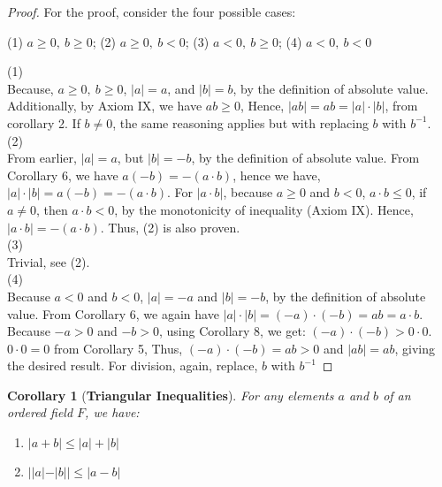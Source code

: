 \documentclass[12pt]{book}
\newtheorem{corollary}{Corollary}
\theoremstyle{definition}
\begin{document}
\begin{proof}
For the proof, consider the four possible cases:
\begin{center}
	(1) $a\geq 0,\: b \geq 0$; (2) $a\geq 0,\: b<0$; (3) $a<0,\: b\geq 0$; (4) $a<0,\: b<0$
\end{center}
(1)\\
Because, $a\geq 0,\: b \geq 0$, $|a| =a$, and $|b| =b$, by the definition of absolute value. Additionally, by Axiom IX, we have $ab\geq 0$, Hence, $|ab|=ab = |a|\cdot |b|$, from corollary 2. If $b\neq 0$, the same reasoning applies but with replacing $b$ with $b^{-1}$.\\
(2)\\
From earlier, $|a|=a$, but $|b|=-b$, by the definition of absolute value. From Corollary 6, we have $a(-b) = -(a\cdot b)$, hence we have, $|a|\cdot |b|= a(-b)=-(a\cdot b)$. For $|a\cdot b|$, because $a\geq 0$ and $b<0$, $a\cdot b \leq 0$, if $a\neq 0$, then $a\cdot b<0$, by the monotonicity of inequality (Axiom IX). Hence, $|a\cdot b| = -(a\cdot b).$ Thus, (2) is also proven.\\
 (3)\\ Trivial, see (2).\\
 (4)\\
 Because $a<0$ and $b<0$, $|a| =-a$ and $|b|=-b$, by the definition of absolute value. From Corollary 6, we again have $|a|\cdot |b| = (-a)\cdot (-b) =ab = a \cdot b$. Because $-a>0$ and $-b>0$, using Corollary 8, we get: $(-a)\cdot (-b) > 0 \cdot 0$. $0\cdot 0= 0$ from Corollary 5, Thus, $(-a)\cdot(-b)=ab >0$ and $|ab|=ab$, giving the desired result. For division, again, replace, $b$ with $b^{-1}$ 
\end{proof}
\begin{corollary}[\textbf{Triangular Inequalities}]
For any elements $a$ and $b$ of an ordered field $F$, we have:
\begin{enumerate}[label=(\roman*)]
	\item $|a+b| \leq |a|+|b|$
	\item $||a|-|b||\leq |a-b|$
\end{enumerate}	
\end{corollary}
\end{document}
